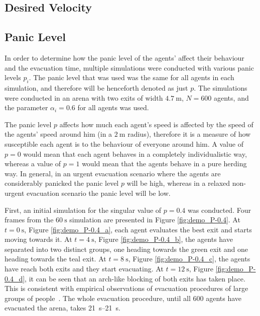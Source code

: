 \subsection{Desired Velocity}


\subsection{Panic Level}
In order to determine how the panic level of the agents' affect their behaviour and the evacuation time, multiple simulations were conducted with various panic levels $p_i$. The panic level that was used was the same for all agents in each simulation, and therefore will be henceforth denoted as just $p$. The simulations were conducted in an arena with two exits of width $\SI{4.7}{\meter}$, $N=600$ agents, and the parameter $\alpha_i=0.6$ for all agents was used.

The panic level $p$ affects how much each agent's speed is affected by the speed of the agents' speed around him (in a $\SI{2}{\meter}$ radius), therefore it is a measure of how susceptible each agent is to the behaviour of everyone around him. A value of $p=0$ would mean that each agent behaves in a completely individualistic way, whereas a value of $p=1$ would mean that the agents behave in a pure herding way. In general, in an urgent evacuation scenario where the agents are considerably panicked the panic level $p$ will be high, whereas in a relaxed non-urgent evacuation scenario the panic level will be low.

First, an initial simulation for the singular value of $p = 0.4$ was conducted. Four frames from the $\SI{60}{\second}$ simulation are presented in Figure \ref{fig:demo_P-0.4}. At $t=\SI{0}{\second}$, Figure \ref{fig:demo_P-0.4_a}, each agent evaluates the best exit and starts moving towards it. At $t=\SI{4}{\second}$, Figure \ref{fig:demo_P-0.4_b}, the agents have separated into two distinct groups, one heading towards the green exit and one heading towards the teal exit. At $t=\SI{8}{\second}$, Figure \ref{fig:demo_P-0.4_c}, the agents have reach both exits and they start evacuating. At $t=\SI{12}{\second}$, Figure \ref{fig:demo_P-0.4_d}, it can be seen that an arch-like blocking of both exits has taken place. This is consistent with empirical observations of evacuation procedures of large groups of people~\cite{Helbing2000}. The whole evacuation procedure, until all $600$ agents have evacuated the arena, takes \SIrange{21}{21}{\second}.

